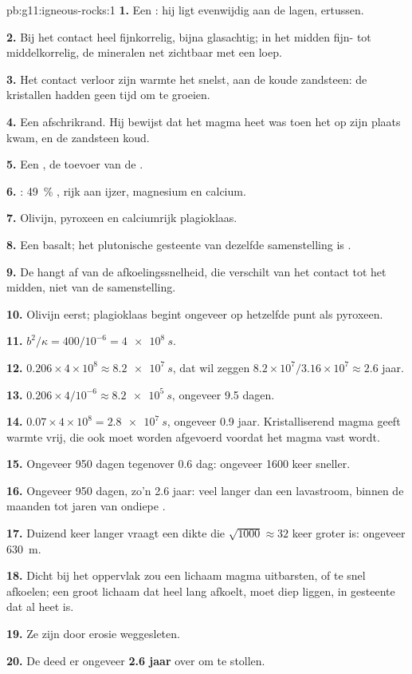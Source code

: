 \begin{solution}{pb:g11:igneous-rocks:1}
\textbf{1.} Een : hij ligt evenwijdig aan de lagen, ertussen.

\textbf{2.} Bij het contact heel fijnkorrelig, bijna glasachtig; in het midden
fijn- tot middelkorrelig, de mineralen net zichtbaar met een loep.

\textbf{3.} Het contact verloor zijn warmte het snelst, aan de koude zandsteen: de
kristallen hadden geen tijd om te groeien.

\textbf{4.} Een afschrikrand. Hij bewijst dat het magma heet was toen het op zijn
plaats kwam, en de zandsteen koud.

\textbf{5.} Een , de toevoer van de .

\textbf{6.} : \qty{49}{\percent} , rijk aan ijzer, magnesium en
calcium.

\textbf{7.} Olivijn, pyroxeen en calciumrijk plagioklaas.

\textbf{8.} Een basalt; het plutonische gesteente van dezelfde samenstelling is .

\textbf{9.} De  hangt af van de afkoelingssnelheid, die verschilt van het
contact tot het midden, niet van de samenstelling.

\textbf{10.} Olivijn eerst; plagioklaas begint ongeveer op hetzelfde punt als
pyroxeen.

\textbf{11.} $b^2/\kappa = 400/10^{-6} = \qty{4e8}{s}$.

\textbf{12.} $0.206 \times 4 \times 10^8 \approx \qty{8.2e7}{s}$, dat wil zeggen
$8.2 \times 10^7 / 3.16 \times 10^7 \approx 2.6$ jaar.

\textbf{13.} $0.206 \times 4/10^{-6} \approx \qty{8.2e5}{s}$, ongeveer 9.5
dagen.

\textbf{14.} $0.07 \times 4 \times 10^8 = \qty{2.8e7}{s}$, ongeveer 0.9 jaar.
Kristalliserend magma geeft warmte vrij, die ook moet worden afgevoerd voordat
het magma vast wordt.

\textbf{15.} Ongeveer 950 dagen tegenover 0.6 dag: ongeveer 1600 keer sneller.

\textbf{16.} Ongeveer 950 dagen, zo'n 2.6 jaar: veel langer dan een lavastroom,
binnen de maanden tot jaren van ondiepe .

\textbf{17.} Duizend keer langer vraagt een dikte die $\sqrt{1000} \approx
32$ keer groter is: ongeveer \qty{630}{m}.

\textbf{18.} Dicht bij het oppervlak zou een lichaam magma uitbarsten, of te snel afkoelen;
een groot lichaam dat heel lang afkoelt, moet diep liggen, in gesteente dat
al heet is.

\textbf{19.} Ze zijn door erosie weggesleten.

\textbf{20.} De  deed er ongeveer \textbf{2.6 jaar} over om te stollen.
\end{solution}
